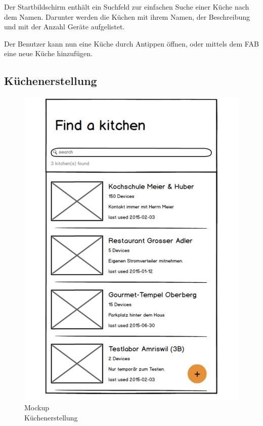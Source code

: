Der Startbildschirm enthält ein Suchfeld zur einfachen Suche einer Küche nach dem Namen. Darunter werden die Küchen mit ihrem Namen, der Beschreibung und mit der Anzahl Geräte aufgelistet. 

Der Benutzer kann nun eine Küche durch Antippen öffnen, oder mittels dem \ac{FAB} eine neue Küche hinzufügen.

\WFclear
\vspace{3cm}

\subsection{Küchenerstellung}
\label{subsec:Küchenerstellung}

\begin{figure}
	\begin{center}
        \vspace{-1cm}
		\includegraphics[page=2,trim=0 0 0 0,clip,scale=0.21]{uiux/res/mockups}
		\caption{Mockup\\Küchenerstellung}
	    \label{abb:mockCreateKitchen}
	\end{center}
\end{figure}

